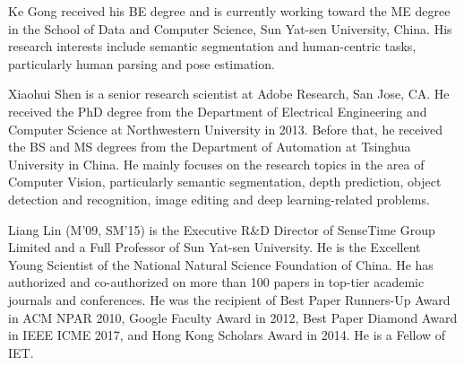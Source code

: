 \documentclass[10pt,journal,compsoc]{IEEEtran}
\begin{document}
\begin{IEEEbiography}{Ke Gong}
received his BE degree and is currently working toward the ME degree in the School of Data and Computer Science, Sun Yat-sen University, China. His research interests include semantic segmentation and human-centric tasks, particularly human parsing and pose estimation.
\end{IEEEbiography}

\begin{IEEEbiography}{Xiaohui Shen}
is a senior research scientist at Adobe Research, San Jose, CA. He received the PhD degree from the Department of Electrical Engineering and Computer Science at Northwestern University in 2013. Before that, he received the BS and MS degrees from the Department of Automation at Tsinghua University in China.  He mainly focuses on the research topics in the area of Computer Vision, particularly semantic segmentation, depth prediction, object detection and recognition, image editing and deep learning-related problems.
\end{IEEEbiography}

\begin{IEEEbiography}{Liang Lin}
(M’09, SM’15) is the Executive R\&D Director of SenseTime Group Limited and a Full Professor of Sun Yat-sen University. He is the Excellent Young Scientist of the National Natural Science Foundation of China. He has authorized and co-authorized on more than 100 papers in top-tier academic journals and conferences. He was the recipient of Best Paper Runners-Up Award in ACM NPAR 2010, Google Faculty Award in 2012, Best Paper Diamond Award in IEEE ICME 2017, and Hong Kong Scholars Award in 2014. He is a Fellow of IET.
\end{IEEEbiography}
\end{document}
